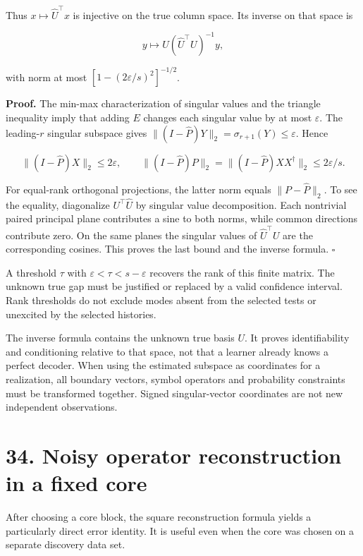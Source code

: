 \documentclass[11pt,letterpaper]{article}
\begin{document}
Thus \(x\mapsto\widehat U^\top x\) is injective on the true column
space. Its inverse on that space is

\[
y\longmapsto U(\widehat U^\top U)^{-1}y,
\]

with norm at most \([1-(2\varepsilon/s)^2]^{-1/2}\).

\textbf{Proof.} The min-max characterization of singular values and the
triangle inequality imply that adding \(E\) changes each singular value
by at most \(\varepsilon\). The leading-\(r\) singular subspace gives
\(\|(I-\widehat P)Y\|_2=\sigma_{r+1}(Y)\leq\varepsilon\). Hence

\[
\|(I-\widehat P)X\|_2\leq2\varepsilon,
\qquad
\|(I-\widehat P)P\|_2
=\|(I-\widehat P)XX^\dagger\|_2\leq2\varepsilon/s.
\]

For equal-rank orthogonal projections, the latter norm equals
\(\|P-\widehat P\|_2\). To see the equality, diagonalize
\(U^\top\widehat U\) by singular value decomposition. Each nontrivial
paired principal plane contributes a sine to both norms, while common
directions contribute zero. On the same planes the singular values of
\(\widehat U^\top U\) are the corresponding cosines. This proves the
last bound and the inverse formula. \(\square\)

A threshold \(\tau\) with \(\varepsilon<\tau<s-\varepsilon\) recovers
the rank of this finite matrix. The unknown true gap must be justified
or replaced by a valid confidence interval. Rank thresholds do not
exclude modes absent from the selected tests or unexcited by the
selected histories.

The inverse formula contains the unknown true basis \(U\). It proves
identifiability and conditioning relative to that space, not that a
learner already knows a perfect decoder. When using the estimated
subspace as coordinates for a realization, all boundary vectors, symbol
operators and probability constraints must be transformed together.
Signed singular-vector coordinates are not new independent observations.

\section{34. Noisy operator reconstruction in a fixed
core}\label{noisy-operator-reconstruction-in-a-fixed-core}

After choosing a core block, the square reconstruction formula yields a
particularly direct error identity. It is useful even when the core was
chosen on a separate discovery data set.
\end{document}
